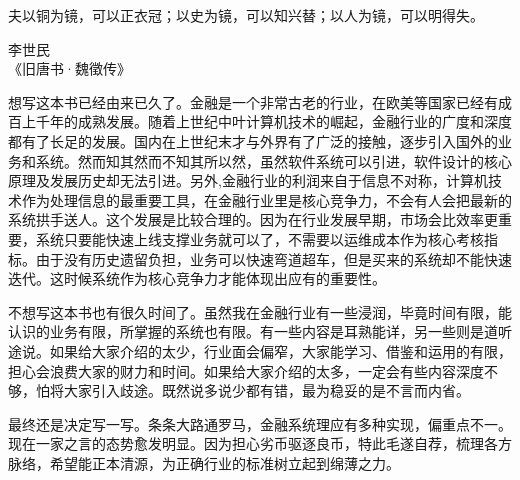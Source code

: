 \epigraph{夫以铜为镜，可以正衣冠；以史为镜，可以知兴替；以人为镜，可以明得失。}{李世民 \\ 《旧唐书·魏徵传》}

想写这本书已经由来已久了。金融是一个非常古老的行业，在欧美等国家已经有成百上千年的成熟发展。随着上世纪中叶计算机技术的崛起，金融行业的广度和深度都有了长足的发展。国内在上世纪末才与外界有了广泛的接触，逐步引入国外的业务和系统。然而知其然而不知其所以然，虽然软件系统可以引进，软件设计的核心原理及发展历史却无法引进。另外,金融行业的利润来自于信息不对称，计算机技术作为处理信息的最重要工具，在金融行业里是核心竞争力，不会有人会把最新的系统拱手送人。这个发展是比较合理的。因为在行业发展早期，市场会比效率更重要，系统只要能快速上线支撑业务就可以了，不需要以运维成本作为核心考核指标。由于没有历史遗留负担，业务可以快速弯道超车，但是买来的系统却不能快速迭代。这时候系统作为核心竞争力才能体现出应有的重要性。


不想写这本书也有很久时间了。虽然我在金融行业有一些浸润，毕竟时间有限，能认识的业务有限，所掌握的系统也有限。有一些内容是耳熟能详，另一些则是道听途说。如果给大家介绍的太少，行业面会偏窄，大家能学习、借鉴和运用的有限，担心会浪费大家的财力和时间。如果给大家介绍的太多，一定会有些内容深度不够，怕将大家引入歧途。既然说多说少都有错，最为稳妥的是不言而内省。


最终还是决定写一写。条条大路通罗马，金融系统理应有多种实现，偏重点不一。现在一家之言的态势愈发明显。因为担心劣币驱逐良币，特此毛遂自荐，梳理各方脉络，希望能正本清源，为正确行业的标准树立起到绵薄之力。
\newline{}
\newline{}



